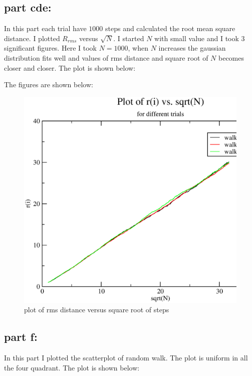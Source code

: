 \documentclass[11pt,a4paper,english]{article}
\begin{document}
	\subsection{part cde: }
	
	In this part each trial have $1000$ steps and calculated the root mean square distance.
	I plotted $R_{rms}$ versus $\sqrt{N}$.
	I started $N$ with small value and I took $3$ significant figures.
	Here I took $N=1000$, when $N$ increases the gaussian distribution fits well and values of 
	rms distance and square root of $N$ becomes closer and closer.
	The plot is shown below:
	
		    The figures are shown below:\\
	\begin{figure}[h!]
	\centering
	\includegraphics [scale=0.6]{figures/hw8qn3c.eps}
	\caption{plot of rms distance versus square root of steps }
	\end{figure}
	\clearpage
	
	
	\subsection{part f: }
	
    In this part I  plotted the scatterplot of random walk.
    The plot is uniform in all the four quadrant.
    The plot is shown below:
    
\end{document}
